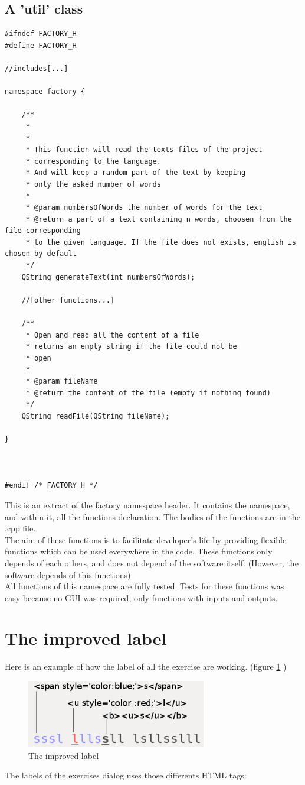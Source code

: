 \subsection{A 'util' class}

\begin{lstlisting}
#ifndef FACTORY_H
#define FACTORY_H

//includes[...]

namespace factory {
    
    /**
     * 
     * 
     * This function will read the texts files of the project
     * corresponding to the language.
     * And will keep a random part of the text by keeping 
     * only the asked number of words
     * 
     * @param numbersOfWords the number of words for the text
     * @return a part of a text containing n words, choosen from the file corresponding
     * to the given language. If the file does not exists, english is chosen by default
     */
    QString generateText(int numbersOfWords);

    //[other functions...]

    /**
     * Open and read all the content of a file
     * returns an empty string if the file could not be
     * open
     *
     * @param fileName
     * @return the content of the file (empty if nothing found)
     */
    QString readFile(QString fileName);

}



#endif /* FACTORY_H */
\end{lstlisting}
This is an extract of the factory namespace header. It contains the namespace, and within it, all the functions declaration. The bodies of the functions are in the .cpp file.\\
The aim of these functions is to facilitate developer's life by providing flexible functions which can be used everywhere in the code. These functions only depends of each others, and does not depend of the software itself. (However, the software depends of this functions).\\
All functions of this namespace are fully tested. Tests for these functions was easy because no GUI was required, only functions with inputs and outputs. 

\section{The improved label}
Here is an example of how the label of all the exercise are working. (figure \ref{improved-label} )
\begin{figure}[H]
	\centering
	\includegraphics[width=0.7\textwidth]{images/dialog-learn-1.png}
	 \caption{The improved label}
	 \label{improved-label}
\end{figure}
The labels of the exercises dialog uses those differents HTML tags:

